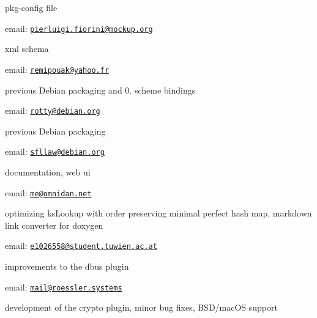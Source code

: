pkg-\/config file


\begin{DoxyItemize}
\item email\+: \href{mailto:pierluigi.fiorini@mockup.org}{\tt pierluigi.\+fiorini@mockup.\+org}
\end{DoxyItemize}

xml schema


\begin{DoxyItemize}
\item email\+: \href{mailto:remipouak@yahoo.fr}{\tt remipouak@yahoo.\+fr}
\end{DoxyItemize}

previous Debian packaging and 0. scheme bindings


\begin{DoxyItemize}
\item email\+: \href{mailto:rotty@debian.org}{\tt rotty@debian.\+org}
\end{DoxyItemize}

previous Debian packaging


\begin{DoxyItemize}
\item email\+: \href{mailto:sfllaw@debian.org}{\tt sfllaw@debian.\+org}
\end{DoxyItemize}

documentation, web ui


\begin{DoxyItemize}
\item email\+: \href{mailto:me@omnidan.net}{\tt me@omnidan.\+net}
\end{DoxyItemize}

optimizing ks\+Lookup with order preserving minimal perfect hash map, markdown link converter for doxygen


\begin{DoxyItemize}
\item email\+: \href{mailto:e1026558@student.tuwien.ac.at}{\tt e1026558@student.\+tuwien.\+ac.\+at}
\end{DoxyItemize}

improvements to the dbus plugin


\begin{DoxyItemize}
\item email\+: \href{mailto:mail@roessler.systems}{\tt mail@roessler.\+systems}
\end{DoxyItemize}

development of the crypto plugin, minor bug fixes, B\+S\+D/mac\+OS support


